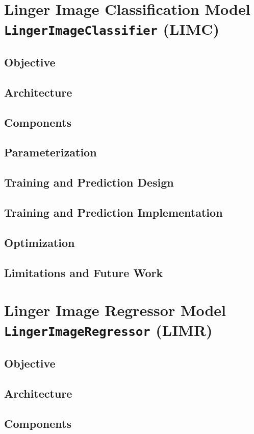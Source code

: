 \documentclass[a4paper, 12pt]{report}
\begin{document}
\section{Linger Image Classification Model \texttt{LingerImageClassifier} (LIMC)}
\label{sec:lingerImage_Classifier_model}
\subsection{Objective}
\subsection{Architecture}
\subsection{Components}
\subsection{Parameterization}
\subsection{Training and Prediction Design}
\subsection{Training and Prediction Implementation}
\subsection{Optimization}
\subsection{Limitations and Future Work}
\section{Linger Image Regressor Model \texttt{LingerImageRegressor} (LIMR)}
\label{sec:lingerImage_Regressor_model}
\subsection{Objective}
\subsection{Architecture}
\subsection{Components}
\end{document}
